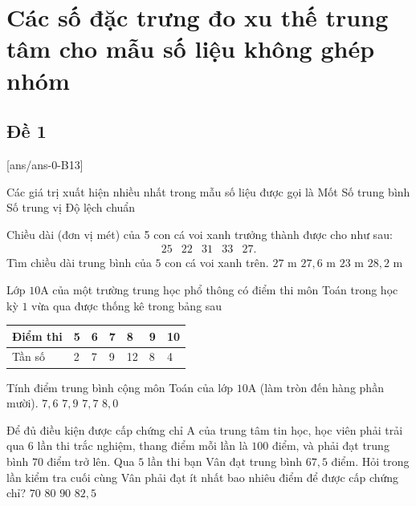 \section{Các số đặc trưng đo xu thế trung tâm cho mẫu số liệu không ghép nhóm}

\subsection{Đề 1}
[ans/ans-0-B13]
\caulc
\begin{ex}%
Các giá trị xuất hiện nhiều nhất trong mẫu số liệu được gọi là
\choice
{\True Mốt}
{Số trung bình}
{Số trung vị}
{Độ lệch chuẩn}
\end{ex}

\begin{ex}%
Chiều dài (đơn vị mét) của 5 con cá voi xanh trưởng thành được cho như sau:
$$
\begin{array}{lllll}
25 & 22 & 31 & 33 & 27.
\end{array}
$$
Tìm chiều dài trung bình của $5$ con cá voi xanh trên.
\choice
{$27$ m}
{\True $27{,}6$ m}
{$23$ m}
{$28{,}2$ m}
\end{ex}

\begin{ex}%
Lớp $10$A của một trường trung học phổ thông có điểm thi môn Toán trong học kỳ $1$ vừa qua được thống kê trong bảng sau
\begin{center}
\begin{tabular}{|l|l|l|l|l|l|l|}
\hline Điểm thi & 5 & 6 & 7 & 8 & 9 & 10 \\
\hline Tần số & 2 & 7 & 9 & 12 & 8 & 4 \\
\hline
\end{tabular}
\end{center}
Tính điểm trung bình cộng môn Toán của lớp $10$A (làm tròn đến hàng phần mười).
\choice
{$7{,}6$}
{$7{,}9$}
{\True $7{,}7$}
{$8{,}0$}
\end{ex}

\begin{ex}%
Để đủ điều kiện được cấp chứng chỉ A của trung tâm tin học, học viên phải trải qua $6$ lần thi trắc nghiệm, thang điểm mỗi lần là $100$ điểm, và phải đạt trung bình $70$ điểm trở lên. Qua $5$ lần thi bạn Vân đạt trung bình $67{,}5$ điểm. Hỏi trong lần kiểm tra cuối cùng Vân phải đạt ít nhất bao nhiêu điểm để được cấp chứng chỉ?
\choice
{$70$}
{$80$}
{$90$}
{\True $82{,}5$}
\end{ex}

